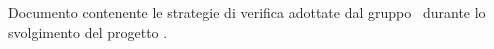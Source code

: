 Documento contenente le strategie di verifica adottate dal gruppo \gruppo\ durante lo svolgimento del progetto \progetto.
